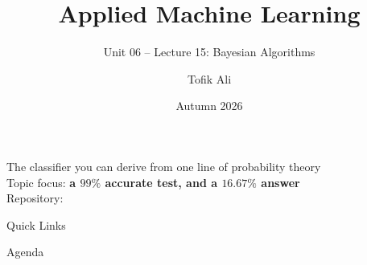 \documentclass[aspectratio=169]{beamer}
\title[Applied Machine Learning]{Applied Machine Learning}
\subtitle{Unit 06 -- Lecture 15: Bayesian Algorithms}
\author{Tofik Ali}
\institute{School of Computer Science, UPES Dehradun}
\date{Autumn 2026}
\begin{document}
\UPESCoverFrame
\setcounter{framenumber}{0}

\begin{frame}
  \titlepage
  \begin{center}
    \footnotesize The classifier you can derive from one line of probability
    theory\\[0.25em]
    \footnotesize Topic focus: \textbf{a $99\%$ accurate test, and a
    $16.67\%$ answer}\\[0.25em]
    \footnotesize Repository: \texttt{\AMLRepoURL}
  \end{center}
  \slidesources{\AMLUnitVISources}
\end{frame}

\begin{frame}{Quick Links}
  \centering
  \hyperlink{sec:bayes}{}\hspace{0.4em}
  \hyperlink{sec:decide}{}\hspace{0.4em}
  \hyperlink{sec:naive}{}\hspace{0.4em}
  \hyperlink{sec:hand}{}\hspace{0.4em}
  \hyperlink{sec:zero}{}\hspace{0.4em}
  \hyperlink{sec:logs}{}\hspace{0.4em}
  \hyperlink{sec:gauss}{}\hspace{0.4em}
  \hyperlink{sec:calib}{}\hspace{0.4em}
  \hyperlink{sec:hurts}{}\hspace{0.4em}
  \hyperlink{sec:summary}{}
\end{frame}

\begin{frame}{Agenda}
  \tableofcontents
\end{frame}
\end{document}
